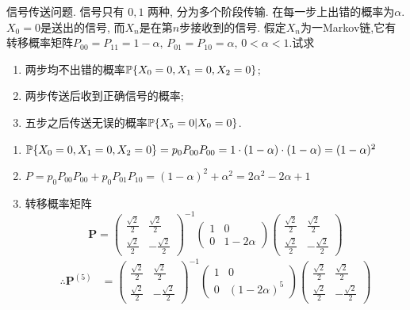\begin{problem}{3.3}
信号传送问题. 信号只有 $0,1$ 两种, 分为多个阶段传输. 在每一步上出错的概率为$\alpha$. $X_0 = 0$是送出的信号, 而$X_n$是在第$n$步接收到的信号. 假定$X_n$为一Markov链,它有转移概率矩阵$P_{00} = P_{11} = 1-\alpha,\,P_{01} = P_{10} = \alpha,\, 0<\alpha <1$.试求
\begin{enumerate}[label=(\alph*)]
	\item 两步均不出错的概率$\mathbb{P}\{X_0 = 0, X_1 = 0, X_2 = 0\}$;
	\item 两步传送后收到正确信号的概率;
	\item 五步之后传送无误的概率$\mathbb{P}\{X_5 = 0 | X_0 = 0\}$.
\end{enumerate}
\end{problem}
\begin{solution}
	\begin{enumerate}[label=(\alph*)]
		\item $\mathbb{P}\{X_0 = 0, X_1 = 0, X_2 = 0\} = p_0P_{00}P_{00} = 1 \cdot (1-\alpha) \cdot (1-\alpha) = (1-\alpha)^2$
		\item $P = p_0P_{00}P_{00} + p_0P_{01}P_{10} = (1-\alpha)^2 + {\alpha}^2 = 2{\alpha}^2 - 2\alpha + 1$
		\item 转移概率矩阵
		      \[\bm{P} = \begin{pmatrix} \frac{\sqrt{2}}{2} & \frac{\sqrt{2}}{2}\\ \frac{\sqrt{2}}{2} & -\frac{\sqrt{2}}{2} \end{pmatrix}^{-1}
			      \begin{pmatrix} 1 & 0 \\ 0 & 1-2\alpha \end{pmatrix}
			      \begin{pmatrix} \frac{\sqrt{2}}{2} & \frac{\sqrt{2}}{2}\\ \frac{\sqrt{2}}{2} & -\frac{\sqrt{2}}{2} \end{pmatrix}\]
		      \[\begin{aligned}
				      \therefore \bm{P}^{(5)} & =
				      \begin{pmatrix} \frac{\sqrt{2}}{2} & \frac{\sqrt{2}}{2}\\ \frac{\sqrt{2}}{2} & -\frac{\sqrt{2}}{2} \end{pmatrix}^{-1}
				      \begin{pmatrix} 1 & 0 \\ 0 & (1-2\alpha)^5 \end{pmatrix}
				      \begin{pmatrix} \frac{\sqrt{2}}{2} & \frac{\sqrt{2}}{2}\\ \frac{\sqrt{2}}{2} & -\frac{\sqrt{2}}{2} \end{pmatrix} \\

\end{aligned}\]
\end{enumerate}
\end{solution}
